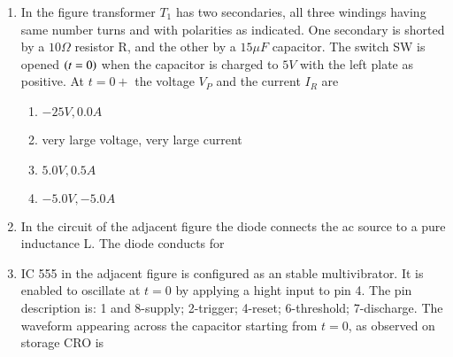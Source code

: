 \documentclass[journal]{IEEEtran}
\numberwithin{equation}{enumi}
\numberwithin{figure}{enumi}
\begin{document}
\begin{enumerate}
    \item 
    In the figure transformer $T_1$ has two secondaries, all three windings having same number turns and with polarities as indicated. One secondary is shorted by a $10\Omega$ resistor R, and the other by a $15 \mu F$ capacitor. The switch SW is opened $\left(t = 0\right)$ when  the capacitor is charged to $5 V$ with the left plate as positive. At $t = 0+$ the voltage $V_P$ and the current $I_R$ are
    \begin{figure}[H]
        \centering
        \resizebox{0.5\textwidth}{!}{}
    \end{figure}

    \begin{enumerate}
        \item $-25V, 0.0A$
        \item very large voltage, very large current
        \item $5.0V, 0.5A$
        \item $-5.0V, -5.0A$
    \end{enumerate}

    \item 
    In the circuit of the adjacent figure the diode connects the ac source to a pure inductance L.
    The diode conducts for

    \begin{figure}[H]
    \centering
    \resizebox{0.39\textwidth}{!}{}
    \end{figure}
    
    \begin{enumerate}
    \end{enumerate}

    \item 
    IC 555 in the adjacent figure is configured as an stable multivibrator. It is enabled to oscillate at $t = 0$ by applying a hight input to pin 4. The pin description is: 1 and 8-supply; 2-trigger; 4-reset; 6-threshold; 7-discharge. The waveform appearing across the capacitor starting from $t = 0$, as observed on storage CRO is
    \begin{figure}[H]
        \centering
        \resizebox{0.3\textwidth}{!}{}
    \end{figure}


\end{enumerate}
\end{document}
